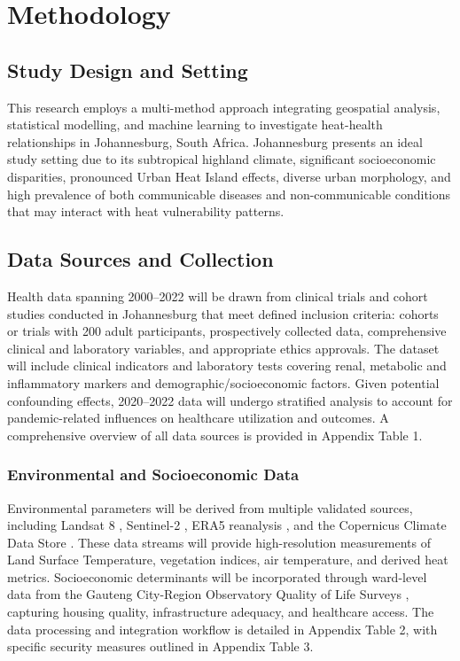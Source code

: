 \section{Methodology}

\subsection{Study Design and Setting}
This research employs a multi-method approach integrating geospatial analysis, statistical modelling, and machine learning to investigate heat-health relationships in Johannesburg, South Africa. Johannesburg presents an ideal study setting due to its subtropical highland climate, significant socioeconomic disparities, pronounced Urban Heat Island effects, diverse urban morphology, and high prevalence of both communicable diseases and non-communicable conditions that may interact with heat vulnerability patterns.

\subsection{Data Sources and Collection}
Health data spanning 2000--2022 will be drawn from clinical trials and cohort studies conducted in Johannesburg that meet defined inclusion criteria: cohorts or trials with 200 adult participants, prospectively collected data, comprehensive clinical and laboratory variables, and appropriate ethics approvals. The dataset will include clinical indicators and laboratory tests covering renal, metabolic and inflammatory markers and demographic/socioeconomic factors. Given potential confounding effects, 2020--2022 data will undergo stratified analysis to account for pandemic-related influences on healthcare utilization and outcomes. A comprehensive overview of all data sources is provided in Appendix Table 1.


\subsubsection{Environmental and Socioeconomic Data}
Environmental parameters will be derived from multiple validated sources, including Landsat 8 \citep{landsat8}, Sentinel-2 \citep{sentinel2}, ERA5 reanalysis \citep{era5}, and the Copernicus Climate Data Store \citep{copernicus_climate_data_store}. These data streams will provide high-resolution measurements of Land Surface Temperature, vegetation indices, air temperature, and derived heat metrics. Socioeconomic determinants will be incorporated through ward-level data from the Gauteng City-Region Observatory Quality of Life Surveys \citep{gcro_qol_survey}, capturing housing quality, infrastructure adequacy, and healthcare access. The data processing and integration workflow is detailed in Appendix Table 2, with specific security measures outlined in Appendix Table 3.

